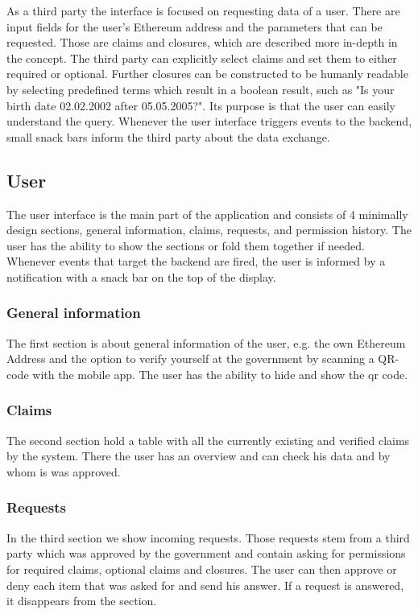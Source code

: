 As a third party the interface is focused on requesting data of a user. There are input fields for the user's Ethereum address
and the parameters that can be requested. Those are claims and closures, which are described more in-depth in the concept.
The third party can explicitly select claims and set them to either required or optional.
Further closures can be constructed to be humanly readable by selecting predefined terms which result in a boolean result,
such as "Is your birth date 02.02.2002 after 05.05.2005?". Its purpose is that the user can easily understand the query.
Whenever the user interface triggers events to the backend, small snack bars inform the third party about the data exchange.

\subsection{User}
\label{sec:user}

The user interface is the main part of the application and consists of 4 minimally design sections, general information,
claims, requests, and permission history. The user has the ability to show the sections or fold them together if needed.
Whenever events that target the backend are fired, the user is informed by a notification with a snack bar on the top of
the display.

\subsubsection{General information}

The first section is about general information of the user, e.g. the own Ethereum Address and the option to verify yourself
at the government by scanning a QR-code with the mobile app. The user has the ability to hide and show the qr code.

\subsubsection{Claims}

The second section hold a table with all the currently existing and verified claims by the system. There the user has an
overview and can check his data and by whom is was approved.

\subsubsection{Requests}

In the third section we show incoming requests. Those requests stem from a third party which was approved by the government
and contain asking for permissions for required claims, optional claims and closures. The user can then approve or deny
each item that was asked for and send his answer. If a request is answered, it disappears from the section.

